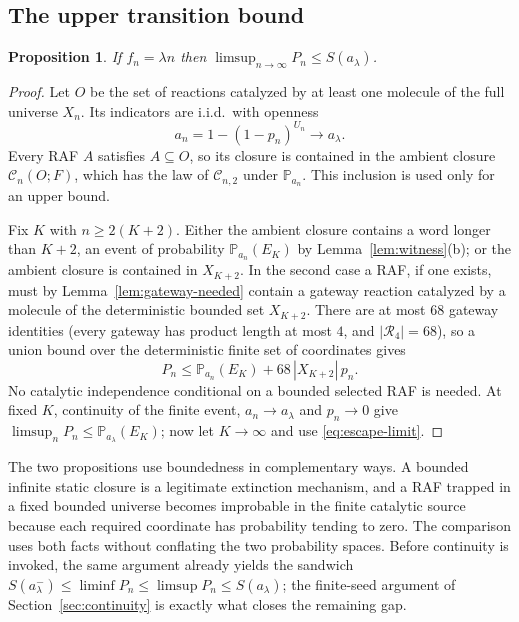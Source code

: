 \documentclass[11pt,reqno]{amsart}
\theoremstyle{plain}
\newtheorem{proposition}[theorem]{Proposition}
\theoremstyle{definition}
\theoremstyle{remark}
\numberwithin{equation}{section}
\newcommand{\Prob}{\mathbb{P}}
\newcommand{\cC}{\mathcal{C}}
\newcommand{\cR}{\mathcal{R}}
\newcommand{\clam}{a_\lambda}
\begin{document}
\subsection{The upper transition bound}

\begin{proposition}\label{prop:upper}
If $f_n=\lambda n$ then $\limsup_{n\to\infty}P_n\le S(\clam)$.
\end{proposition}

\begin{proof}
Let $O$ be the set of reactions catalyzed by at least one molecule of the full universe $X_n$. Its indicators are i.i.d.\ with openness
\[
a_n=1-(1-p_n)^{U_n}\longrightarrow\clam .
\]
Every RAF $A$ satisfies $A\subseteq O$, so its closure is contained in the ambient closure $\cC_n(O;F)$, which has the law of $\cC_{n,2}$ under $\Prob_{a_n}$. This inclusion is used only for an upper bound.

Fix $K$ with $n\ge2(K+2)$. Either the ambient closure contains a word longer than $K+2$, an event of probability $\Prob_{a_n}(E_K)$ by Lemma~\ref{lem:witness}(b); or the ambient closure is contained in $X_{K+2}$. In the second case a RAF, if one exists, must by Lemma~\ref{lem:gateway-needed} contain a gateway reaction catalyzed by a molecule of the deterministic bounded set $X_{K+2}$. There are at most $68$ gateway identities (every gateway has product length at most $4$, and $|\cR_4|=68$), so a union bound over the deterministic finite set of coordinates gives
\begin{equation}\label{eq:upper-finite}
P_n\le\Prob_{a_n}(E_K)+68\,|X_{K+2}|\,p_n .
\end{equation}
No catalytic independence conditional on a bounded selected RAF is needed. At fixed $K$, continuity of the finite event, $a_n\to\clam$ and $p_n\to0$ give $\limsup_nP_n\le\Prob_{\clam}(E_K)$; now let $K\to\infty$ and use \eqref{eq:escape-limit}.
\end{proof}

The two propositions use boundedness in complementary ways. A bounded infinite static closure is a legitimate extinction mechanism, and a RAF trapped in a fixed bounded universe becomes improbable in the finite catalytic source because each required coordinate has probability tending to zero. The comparison uses both facts without conflating the two probability spaces. Before continuity is invoked, the same argument already yields the sandwich $S(\clam^-)\le\liminf P_n\le\limsup P_n\le S(\clam)$; the finite-seed argument of Section~\ref{sec:continuity} is exactly what closes the remaining gap.
\end{document}
